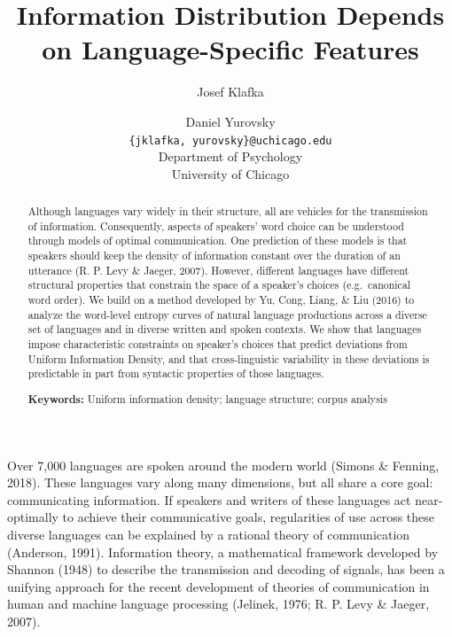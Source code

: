 \documentclass[10pt, letterpaper]{article}
\title{Information Distribution Depends on Language-Specific Features}
\author{Josef Klafka \and Daniel Yurovsky \\
        \texttt{\{jklafka, yurovsky\}@uchicago.edu} \\
       Department of Psychology \\ University of Chicago}
\begin{document}
\maketitle

\begin{abstract}
Although languages vary widely in their structure, all are vehicles for
the transmission of information. Consequently, aspects of speakers' word
choice can be understood through models of optimal communication. One
prediction of these models is that speakers should keep the density of
information constant over the duration of an utterance (R. P. Levy \&
Jaeger, 2007). However, different languages have different structural
properties that constrain the space of a speaker's choices
(e.g.~canonical word order). We build on a method developed by Yu, Cong,
Liang, \& Liu (2016) to analyze the word-level entropy curves of natural
language productions across a diverse set of languages and in diverse
written and spoken contexts. We show that languages impose
characteristic constraints on speaker's choices that predict deviations
from Uniform Information Density, and that cross-linguistic variability
in these deviations is predictable in part from syntactic properties of
those languages.

\textbf{Keywords:}
Uniform information density; language structure; corpus analysis
\end{abstract}

Over 7,000 languages are spoken around the modern world (Simons \&
Fenning, 2018). These languages vary along many dimensions, but all
share a core goal: communicating information. If speakers and writers of
these languages act near-optimally to achieve their communicative goals,
regularities of use across these diverse languages can be explained by a
rational theory of communication (Anderson, 1991). Information theory, a
mathematical framework developed by Shannon (1948) to describe the
transmission and decoding of signals, has been a unifying approach for
the recent development of theories of communication in human and machine
language processing (Jelinek, 1976; R. P. Levy \& Jaeger, 2007).
\end{document}
